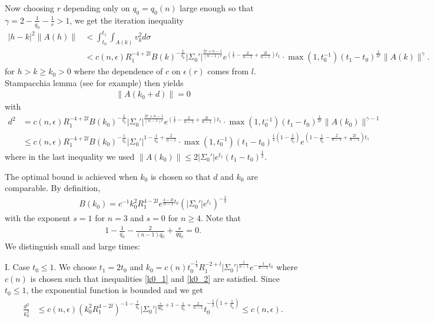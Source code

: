 \documentclass[12pt,twoside]{article}
\theoremstyle{plain}
\theoremstyle{definition}
\theoremstyle{remark}
\newcommand{\lt}{\left}
\newcommand{\rt}{\right}
\numberwithin{equation}{section}
\begin{document}
Now choosing $r$ depending only on $q_0 = q_0(n)$ large enough so that $\gamma = 2 - \frac{1}{q_0} - \frac{1}{r} > 1$, we get the iteration inequality
\begin{align*}
|h-k|^2 \| A(h)\| &< \int_{t_0}^{t_1} \int_{A(k)} v_k^2 d\sigma\\
&< c(n,\epsilon) R_1^{-4+2l} B(k)^{-\frac{1}{q_0}} |\Sigma_0'|^{\frac{2r+n-1}{(n-1)r}} e^{(\frac{1}{r} - \frac{2}{n-1} + \frac{2l}{n-1}) t_1}\cdot \max( 1, t_0^{-1} ) (t_1 - t_0)^{\frac{1}{2r}} \| A(k)\|^{\gamma}  .  
\end{align*}
for $h>k \ge k_0 > 0$ where the dependence of $c$ on $\epsilon(r)$ comes from $l$. Stampacchia lemma (see \cite{Fre} for example) then yields
\begin{align*}
\|  A(k_0 + d) \| =0
\end{align*} with
\begin{align*}
d^2 &= c(n,\epsilon) R_1^{-4+2l}  B(k_0)^{-\frac{1}{q_0}}  |\Sigma_0'|^{\frac{2r+n-1}{(n-1)r}} e^{(\frac{1}{r} - \frac{2}{n-1} + \frac{2l}{n-1}) t_1} \cdot \max( 1, t_0^{-1})  (t_1 - t_0)^{\frac{1}{2r}} \| A(k_0)\|^{\gamma-1}\\
&\le c(n,\epsilon) R_1^{-4+2l} B(k_0)^{-\frac{1}{q_0}} |\Sigma_0'|^{1 - \frac{1}{q_0} + \frac{2}{n-1}}\cdot \max( 1, t_0^{-1})(t_1 - t_0)^{\frac{1}{2}(1 - \frac{1}{q_0})} e^{\lt( 1 - \frac{1}{q_0} - \frac{2}{n-1}+ \frac{2l}{n-1} \rt)t_1}
\end{align*}
where in the last inequality we used $\| A(k_0)\| \le 2 |\Sigma_0'| e^{t_1} (t_1 - t_0)^{\frac{1}{2}}$. 

The optimal bound is achieved when $k_0$ is chosen so that $d$ and $k_0$ are comparable. By definition, 
\begin{align*}
B(k_0) = c^{-1} k_0^2 R_1^{4-2l} e^{\frac{4-2l}{n-1} t_0} \lt( |\Sigma_0'| e^{t_1} \rt)^{-\frac{s}{q}}
\end{align*}
with the exponent $s=1$ for $n=3$ and $s=0$ for $n \ge 4$. Note that
\begin{align*}
1 - \frac{1}{q_0} - \frac{2}{(n-1)q_0} + \frac{s}{qq_0} =0.
\end{align*}
We distinguish small and large times:

I. Case $t_0 \le 1$. We choose $t_1 = 2 t_0$ and $k_0 = c(n) t_0^{-\frac{1}{4}} R_1^{-2+l} |\Sigma_0'|^{\frac{1}{n-1}} e^{-\frac{1}{n-1}t_0}$ where $c(n)$ is chosen such that inequalities \eqref{k0_1} and \eqref{k0_2} are satisfied. Since $t_0 \le 1$, the exponential function is bounded and we get
\begin{align*}
\frac{d^2}{k_0^2} &\le c(n,\epsilon) ( k_0^2 R_1^{4-2l} )^{-1 - \frac{1}{q_0}} |\Sigma_0'|^{\frac{s}{qq_0} + 1 - \frac{1}{q_0} + \frac{2}{n-1}} t_0^{-\frac{1}{2} (1 + \frac{1}{q_0})} \le c(n,\epsilon).    
\end{align*}
\end{document}
